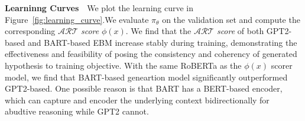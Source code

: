 \noindent\textbf{Learninng Curves}~~We plot the learning curve in Figure~\ref{fig:learning_curve}.We evaluate 
$\pi_\theta$ on the validation set and compute the corresponding $\mathcal{ART}$ \textit{score} $\phi(x)$.
We find that the $\mathcal{ART}$ \textit{score} of both GPT2-based and BART-based EBM increase stably during training, demonstrating the effectiveness and feasibility of posing the consistency and coherency of generated hypothesis to
training objective. 
With the same RoBERTa as the $\phi(x)$ scorer model, we find that BART-based geneartion model significantly 
outperformed GPT2-based. 
One possible reason is that BART has a BERT-based encoder, which can capture and encoder the
underlying context bidirectionally for abudtive reasoning while GPT2 cannot. 

